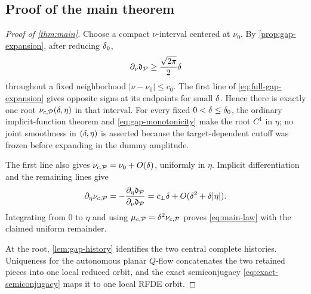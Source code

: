 \subsection{Proof of the main theorem}

\begin{proof}[Proof of \cref{thm:main}]
Choose a compact \(\nu\)-interval centered at \(\nu_0\).  By
\cref{prop:gap-expansion}, after reducing \(\delta_0\),
\begin{equation}
\label{eq:gap-monotonicity}
 \partial_\nu\mathfrak d_\mathcal P
 \ge\frac{\sqrt{2\pi}}2\delta
\end{equation}
throughout a fixed neighborhood
\(|\nu-\nu_0|\le c_0\).  The first line of
\cref{eq:full-gap-expansion} gives opposite signs at its endpoints for
small \(\delta\).  Hence there is exactly one root
\(\nu_{c,\mathcal P}(\delta,\eta)\) in that interval.  For every fixed
\(0<\delta\le\delta_0\), the ordinary implicit-function theorem and
\cref{eq:gap-monotonicity} make the root \(C^1\) in \(\eta\); no joint
smoothness in \((\delta,\eta)\) is asserted because the target-dependent
cutoff was frozen before expanding in the dummy amplitude.

The first line also gives \(\nu_{c,\mathcal P}=\nu_0+O(\delta)\), uniformly in
\(\eta\).  Implicit differentiation and the remaining lines give
\begin{equation}
 \partial_\eta\nu_{c,\mathcal P}
 =-\frac{\partial_\eta\mathfrak d_\mathcal P}
         {\partial_\nu\mathfrak d_\mathcal P}
 =c_\perp\delta+O(\delta^2+\delta|\eta|).
\end{equation}
Integrating from \(0\) to \(\eta\) and using
\(\mu_{c,\mathcal P}=\delta^2\nu_{c,\mathcal P}\) proves
\cref{eq:main-law} with the claimed uniform remainder.

At the root, \cref{lem:gap-history} identifies the two central complete
histories.  Uniqueness for the autonomous planar \(Q\)-flow concatenates
the two retained pieces into one local reduced orbit, and the exact
semiconjugacy \cref{eq:exact-semiconjugacy} maps it to one local RFDE orbit.
\end{proof}
